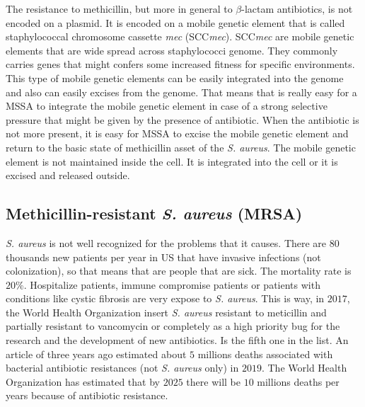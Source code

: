 The resistance to methicillin, but more in general to $\beta$-lactam antibiotics, is not encoded on a plasmid. It is encoded on a mobile genetic element that is called staphylococcal chromosome cassette \emph{mec} (SCC\emph{mec}). SCC\emph{mec} are mobile genetic elements that are wide spread across staphylococci genome. They commonly carries genes that might confers some increased fitness for specific environments. This type of mobile genetic elements can be easily integrated into the genome and also can easily excises from the genome. That means that is really easy for a MSSA to integrate the mobile genetic element in case of a strong selective pressure that might be given by the presence of antibiotic. When the antibiotic is not more present, it is easy for MSSA to excise the mobile genetic element and return to the basic state of methicillin asset of the \emph{S. aureus}. 
The mobile genetic element is not maintained inside the cell. It is integrated into the cell or it is excised and released outside.

\subsection{Methicillin-resistant \emph{S. aureus} (MRSA)}
\emph{S. aureus} is not well recognized for the problems that it causes. There are $80$ thousands new patients per year in US that have invasive infections (not colonization), so that means that are people that are sick. The mortality rate is $20$\%. 
Hospitalize patients, immune compromise patients or patients with conditions like cystic fibrosis are very expose to \emph{S. aureus}. This is way, in $2017$, the World Health Organization insert \emph{S. aureus} resistant to meticillin and partially resistant to vancomycin or completely as a high priority bug for the research and the development of new antibiotics. Is the fifth one in the list.
An article of three years ago estimated about $5$ millions deaths associated with bacterial antibiotic resistances (not \emph{S. aureus} only) in $2019$. The World Health Organization has estimated that by $2025$ there will be $10$ millions deaths per years because of antibiotic resistance. 

